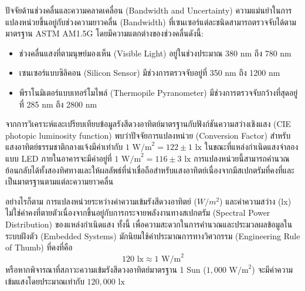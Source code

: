 ปัจจัยด้านช่วงคลื่นและความคลาดเคลื่อน (Bandwidth and Uncertainty)
ความแม่นยำในการแปลงหน่วยขึ้นอยู่กับช่วงความยาวคลื่น (Bandwidth) ที่เซนเซอร์แต่ละชนิดสามารถตรวจจับได้ตามมาตรฐาน ASTM AM1.5G โดยมีความแตกต่างของช่วงคลื่นดังนี้:
\begin{itemize}
    \item ช่วงคลื่นแสงที่ตามนุษย์มองเห็น (Visible Light) อยู่ในช่วงประมาณ 380 nm ถึง 780 nm 
    \item เซนเซอร์แบบซิลิคอน (Silicon Sensor) มีช่วงการตรวจจับอยู่ที่ 350 nm ถึง 1200 nm 
    \item พีราโนมิเตอร์แบบเทอร์โมไพล์ (Thermopile Pyranometer) มีช่วงการตรวจจับกว้างที่สุดอยู่ที่ 285 nm ถึง 2800 nm 
\end{itemize}

จากการวิเคราะห์และเปรียบเทียบข้อมูลรังสีดวงอาทิตย์มาตรฐานกับฟังก์ชันความสว่างเชิงแสง (CIE photopic luminosity function) พบว่าปัจจัยการแปลงหน่วย (Conversion Factor) สำหรับแสงอาทิตย์ธรรมชาติกลางแจ้งมีค่าเท่ากับ $1 \text{ W/m}^2 = 122 \pm 1 \text{ lx}$ ในขณะที่แหล่งกำเนิดแสงจำลองแบบ LED ภายในอาคารจะมีค่าอยู่ที่ $1 \text{ W/m}^2 = 116 \pm 3 \text{ lx}$ การแปลงหน่วยนี้สามารถคำนวณย้อนกลับได้ทั้งสองทิศทางและให้ผลลัพธ์ที่น่าเชื่อถือสำหรับแสงอาทิตย์เนื่องจากมีสเปกตรัมที่คงที่และเป็นมาตรฐานตามแต่ละความยาวคลื่น

อย่างไรก็ตาม การแปลงหน่วยระหว่างค่าความเข้มรังสีดวงอาทิตย์ ($W/m^2$) และค่าความสว่าง (lx) ไม่ใช่ค่าคงที่ตายตัวเนื่องจากขึ้นอยู่กับการกระจายพลังงานทางสเปกตรัม (Spectral Power Distribution) ของแหล่งกำเนิดแสง ทั้งนี้ เพื่อความสะดวกในการคำนวณและประมวลผลข้อมูลในระบบฝังตัว (Embedded Systems) มักนิยมใช้ค่าประมาณการทางวิศวกรรม (Engineering Rule of Thumb) ที่คงที่คือ 
\begin{equation}
    120 \text{ lx} \approx 1 \text{ W/m}^2
\end{equation}
หรือหากพิจารณาที่สภาวะความเข้มรังสีดวงอาทิตย์มาตรฐาน 1 Sun ($1,000 \text{ W/m}^2$) จะมีค่าความเข้มแสงโดยประมาณเท่ากับ $120,000 \text{ lx}$ 
\cite{michael2020conversion}

